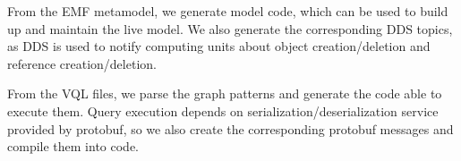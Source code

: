 From the EMF metamodel, we generate model code, which can be used to build up and maintain the live model. 
We also generate the corresponding DDS topics, as DDS is used to notify computing units about object creation/deletion and reference creation/deletion.

From the VQL files, we parse the graph patterns and generate the code able to execute them.
Query execution depends on serialization/deserialization service provided by protobuf, so we also create the corresponding protobuf messages and compile them into \cpp{} code.
